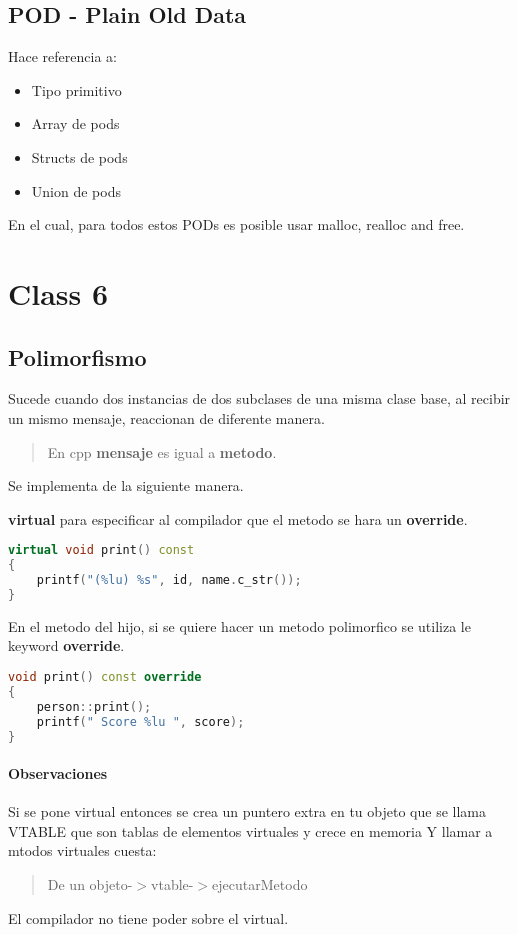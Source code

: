 \documentclass[11pt,letterpaper]{article}
\begin{document}
\subsection{POD - Plain Old Data}
Hace referencia a:
\begin{itemize}
    \item Tipo primitivo
    \item Array de pods
    \item Structs de pods
    \item Union de pods
\end{itemize}
En el cual, para todos estos PODs es posible usar malloc, realloc and free.


\section{Class 6}
\subsection{Polimorfismo}
Sucede cuando dos instancias de dos subclases de una misma clase base,
al recibir un mismo mensaje, reaccionan de diferente manera. \par

\begin{quote}
    En cpp \textbf{mensaje} es igual a \textbf{metodo}.
\end{quote}
Se implementa de la siguiente manera.

\textbf{virtual} para especificar al compilador que el metodo se 
hara un \textbf{override}. 
\begin{lstlisting}[language=C++, caption={Metodo del Padre}]
virtual void print() const
{
    printf("(%lu) %s", id, name.c_str());
}
\end{lstlisting}

En el metodo del hijo, si se quiere hacer un metodo polimorfico se 
utiliza le keyword \textbf{override}.
\begin{lstlisting}[language=C++, caption={Metodo del Hijo}]
void print() const override
{
    person::print();
    printf(" Score %lu ", score);
}
\end{lstlisting}

\paragraph{Observaciones}
Si se pone virtual entonces se crea un puntero extra en tu objeto
 que se llama VTABLE
 que son tablas de elementos virtuales y crece en memoria
 Y llamar a mtodos virtuales cuesta:
\begin{quote}
    De un objeto-$>$vtable-$>$ejecutarMetodo
\end{quote}
 El compilador no tiene poder sobre el virtual.
\end{document}
